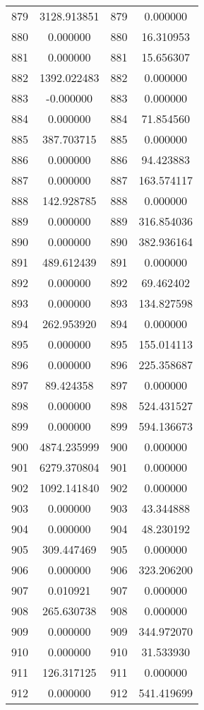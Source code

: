 \documentclass[12pt]{article}
\begin{document}
\begin{longtable}{@{}cccc@{}}
879 & 3128.913851 & 879 & 0.000000 \\
880 & 0.000000 & 880 & 16.310953 \\
881 & 0.000000 & 881 & 15.656307 \\
882 & 1392.022483 & 882 & 0.000000 \\
883 & -0.000000 & 883 & 0.000000 \\
884 & 0.000000 & 884 & 71.854560 \\
885 & 387.703715 & 885 & 0.000000 \\
886 & 0.000000 & 886 & 94.423883 \\
887 & 0.000000 & 887 & 163.574117 \\
888 & 142.928785 & 888 & 0.000000 \\
889 & 0.000000 & 889 & 316.854036 \\
890 & 0.000000 & 890 & 382.936164 \\
891 & 489.612439 & 891 & 0.000000 \\
892 & 0.000000 & 892 & 69.462402 \\
893 & 0.000000 & 893 & 134.827598 \\
894 & 262.953920 & 894 & 0.000000 \\
895 & 0.000000 & 895 & 155.014113 \\
896 & 0.000000 & 896 & 225.358687 \\
897 & 89.424358 & 897 & 0.000000 \\
898 & 0.000000 & 898 & 524.431527 \\
899 & 0.000000 & 899 & 594.136673 \\
900 & 4874.235999 & 900 & 0.000000 \\
901 & 6279.370804 & 901 & 0.000000 \\
902 & 1092.141840 & 902 & 0.000000 \\
903 & 0.000000 & 903 & 43.344888 \\
904 & 0.000000 & 904 & 48.230192 \\
905 & 309.447469 & 905 & 0.000000 \\
906 & 0.000000 & 906 & 323.206200 \\
907 & 0.010921 & 907 & 0.000000 \\
908 & 265.630738 & 908 & 0.000000 \\
909 & 0.000000 & 909 & 344.972070 \\
910 & 0.000000 & 910 & 31.533930 \\
911 & 126.317125 & 911 & 0.000000 \\
912 & 0.000000 & 912 & 541.419699 \\

\end{longtable}
\end{document}
